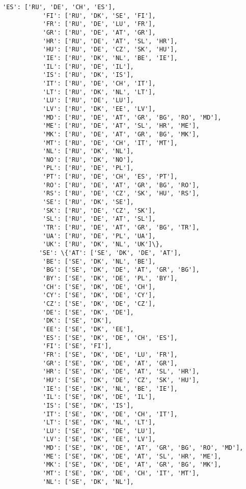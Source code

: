 \documentclass[11pt]{article}
\begin{document}
\begin{Verbatim}[commandchars=\\\{\}]
           'ES': ['RU', 'DE', 'CH', 'ES'],
           'FI': ['RU', 'DK', 'SE', 'FI'],
           'FR': ['RU', 'DE', 'LU', 'FR'],
           'GR': ['RU', 'DE', 'AT', 'GR'],
           'HR': ['RU', 'DE', 'AT', 'SL', 'HR'],
           'HU': ['RU', 'DE', 'CZ', 'SK', 'HU'],
           'IE': ['RU', 'DK', 'NL', 'BE', 'IE'],
           'IL': ['RU', 'DE', 'IL'],
           'IS': ['RU', 'DK', 'IS'],
           'IT': ['RU', 'DE', 'CH', 'IT'],
           'LT': ['RU', 'DK', 'NL', 'LT'],
           'LU': ['RU', 'DE', 'LU'],
           'LV': ['RU', 'DK', 'EE', 'LV'],
           'MD': ['RU', 'DE', 'AT', 'GR', 'BG', 'RO', 'MD'],
           'ME': ['RU', 'DE', 'AT', 'SL', 'HR', 'ME'],
           'MK': ['RU', 'DE', 'AT', 'GR', 'BG', 'MK'],
           'MT': ['RU', 'DE', 'CH', 'IT', 'MT'],
           'NL': ['RU', 'DK', 'NL'],
           'NO': ['RU', 'DK', 'NO'],
           'PL': ['RU', 'DE', 'PL'],
           'PT': ['RU', 'DE', 'CH', 'ES', 'PT'],
           'RO': ['RU', 'DE', 'AT', 'GR', 'BG', 'RO'],
           'RS': ['RU', 'DE', 'CZ', 'SK', 'HU', 'RS'],
           'SE': ['RU', 'DK', 'SE'],
           'SK': ['RU', 'DE', 'CZ', 'SK'],
           'SL': ['RU', 'DE', 'AT', 'SL'],
           'TR': ['RU', 'DE', 'AT', 'GR', 'BG', 'TR'],
           'UA': ['RU', 'DE', 'PL', 'UA'],
           'UK': ['RU', 'DK', 'NL', 'UK']\},
          'SE': \{'AT': ['SE', 'DK', 'DE', 'AT'],
           'BE': ['SE', 'DK', 'NL', 'BE'],
           'BG': ['SE', 'DK', 'DE', 'AT', 'GR', 'BG'],
           'BY': ['SE', 'DK', 'DE', 'PL', 'BY'],
           'CH': ['SE', 'DK', 'DE', 'CH'],
           'CY': ['SE', 'DK', 'DE', 'CY'],
           'CZ': ['SE', 'DK', 'DE', 'CZ'],
           'DE': ['SE', 'DK', 'DE'],
           'DK': ['SE', 'DK'],
           'EE': ['SE', 'DK', 'EE'],
           'ES': ['SE', 'DK', 'DE', 'CH', 'ES'],
           'FI': ['SE', 'FI'],
           'FR': ['SE', 'DK', 'DE', 'LU', 'FR'],
           'GR': ['SE', 'DK', 'DE', 'AT', 'GR'],
           'HR': ['SE', 'DK', 'DE', 'AT', 'SL', 'HR'],
           'HU': ['SE', 'DK', 'DE', 'CZ', 'SK', 'HU'],
           'IE': ['SE', 'DK', 'NL', 'BE', 'IE'],
           'IL': ['SE', 'DK', 'DE', 'IL'],
           'IS': ['SE', 'DK', 'IS'],
           'IT': ['SE', 'DK', 'DE', 'CH', 'IT'],
           'LT': ['SE', 'DK', 'NL', 'LT'],
           'LU': ['SE', 'DK', 'DE', 'LU'],
           'LV': ['SE', 'DK', 'EE', 'LV'],
           'MD': ['SE', 'DK', 'DE', 'AT', 'GR', 'BG', 'RO', 'MD'],
           'ME': ['SE', 'DK', 'DE', 'AT', 'SL', 'HR', 'ME'],
           'MK': ['SE', 'DK', 'DE', 'AT', 'GR', 'BG', 'MK'],
           'MT': ['SE', 'DK', 'DE', 'CH', 'IT', 'MT'],
           'NL': ['SE', 'DK', 'NL'],

\end{Verbatim}
\end{document}
